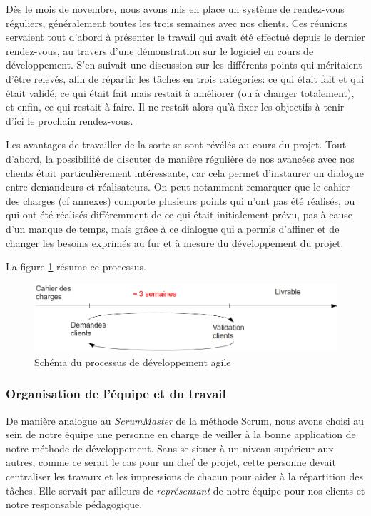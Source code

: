 Dès le mois de novembre, nous avons mis en place un système de rendez-vous réguliers, généralement toutes les trois semaines avec nos clients. Ces réunions servaient tout d'abord à présenter le travail qui avait été effectué depuis le dernier rendez-vous, au travers d'une démonstration sur le logiciel en cours de développement. S'en suivait une discussion sur les différents points qui méritaient d'être relevés, afin de répartir les tâches en trois catégories: ce qui était fait et qui était validé, ce qui était fait mais restait à améliorer (ou à changer totalement), et enfin, ce qui restait à faire. Il ne restait alors qu'à fixer les objectifs à tenir d'ici le prochain rendez-vous.

Les avantages de travailler de la sorte se sont révélés au cours du projet. Tout d'abord, la possibilité de discuter de manière régulière de nos avancées avec nos clients était particulièrement intéressante, car cela permet d'instaurer un dialogue entre demandeurs et réalisateurs. On peut notamment remarquer que le cahier des charges (cf annexes) comporte plusieurs points qui n'ont pas été réalisés, ou qui ont été réalisés différemment de ce qui était initialement prévu, pas à cause d'un manque de temps, mais grâce à ce dialogue qui a permis d'affiner et de changer les besoins exprimés au fur et à mesure du développement du projet.

La figure \ref{agile} résume ce processus.

\begin{figure}[H]
\begin{center}
\includegraphics[width=450px]{methode_agile.png}
\caption{Schéma du processus de développement agile}
\label{agile}
\end{center}
\end{figure}

\subsubsection{Organisation de l'équipe et du travail}

De manière analogue au \textit{ScrumMaster} de la méthode Scrum, nous avons choisi au sein de notre équipe une personne en charge de veiller à la bonne application de notre méthode de développement. Sans se situer à un niveau supérieur aux autres, comme ce serait le cas pour un chef de projet, cette personne devait centraliser les travaux et les impressions de chacun pour aider à la répartition des tâches. Elle servait par ailleurs de \textit{représentant} de notre équipe pour nos clients et notre responsable pédagogique.

